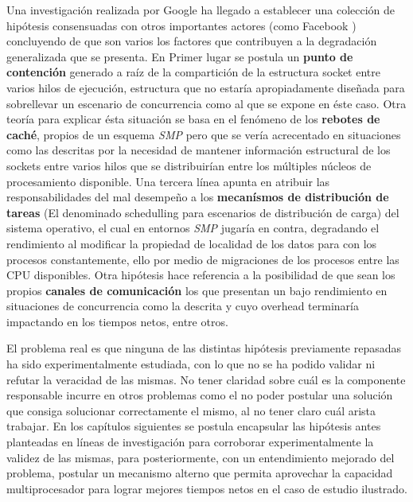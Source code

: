 Una investigación realizada por Google \cite{slides:googleReuseport} ha llegado a establecer una colección de hipótesis consensuadas con otros importantes actores (como Facebook \cite{post:facebook}) concluyendo de que son varios los factores que contribuyen a la degradación generalizada que se presenta. En Primer lugar se postula un \textbf{punto de contención} generado a raíz de la compartición de la estructura socket entre varios hilos de ejecución, estructura que no estaría apropiadamente diseñada para sobrellevar un escenario de concurrencia como al que se expone en éste caso. Otra teoría para explicar ésta situación se basa en el fenómeno de los \textbf{rebotes de caché}, propios de un esquema \emph{SMP} pero que se vería acrecentado en situaciones como las descritas por la necesidad de mantener información estructural de los sockets entre varios hilos que se distribuirían entre los múltiples núcleos de procesamiento disponible. Una tercera línea apunta en atribuir las responsabilidades del mal desempeño a los \textbf{mecanísmos de distribución de tareas} (El denominado schedulling para escenarios de distribución de carga) del sistema operativo, el cual en entornos \emph{SMP} jugaría en contra, degradando el rendimiento al modificar la propiedad de localidad de los datos para con los procesos constantemente, ello por medio de migraciones de los procesos entre las CPU disponibles. Otra hipótesis hace referencia a la posibilidad de que sean los propios \textbf{canales de comunicación} los que presentan un bajo rendimiento en situaciones de concurrencia como la descrita y cuyo overhead terminaría impactando en los tiempos netos, entre otros.

El problema real es que ninguna de las distintas hipótesis previamente repasadas ha sido experimentalmente estudiada, con lo que no se ha podido validar ni refutar la veracidad de las mismas. No tener claridad sobre cuál es la componente responsable incurre en otros problemas como el no poder postular una solución que consiga solucionar correctamente el mismo, al no tener claro cuál arista trabajar. En los capítulos siguientes se postula encapsular las hipótesis antes planteadas en líneas de investigación para corroborar experimentalmente la validez de las mismas, para posteriormente, con un entendimiento mejorado del problema, postular un mecanismo alterno que permita aprovechar la capacidad multiprocesador para lograr mejores tiempos netos en el caso de estudio ilustrado.
